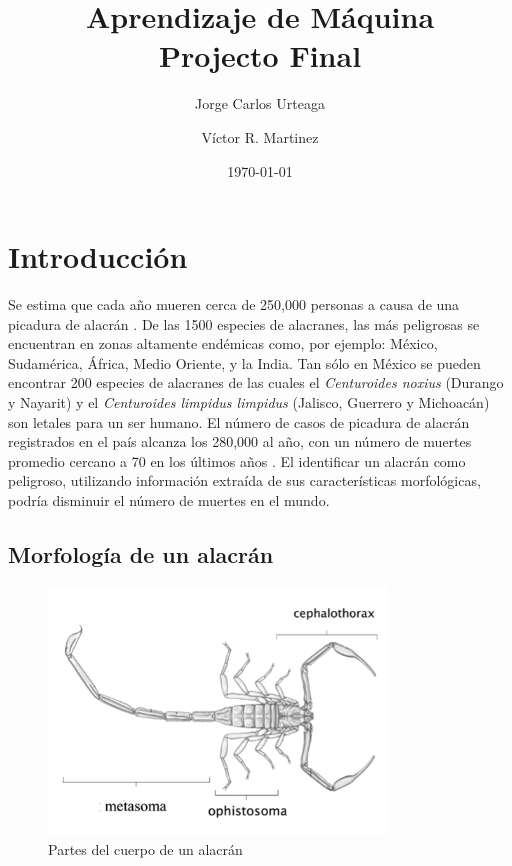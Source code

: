 \documentclass[a4paper, 10pt]{article}
\author{Jorge Carlos Urteaga \and Víctor R. Martinez}
\title{Aprendizaje de Máquina \\ Projecto Final}
\date{\today}
\begin{document}


\maketitle

\section{Introducción}
Se estima que cada año mueren cerca de 250,000 personas a causa de una picadura de alacrán \cite{Chippaux}. De las 1500 especies de alacranes, las más peligrosas se encuentran en zonas altamente endémicas como, por ejemplo: México, Sudamérica, África, Medio Oriente, y la India. Tan sólo en México se pueden encontrar 200 especies de alacranes de las cuales el \emph{Centuroides noxius} (Durango y Nayarit) y el \emph{Centuroides limpidus limpidus} (Jalisco, Guerrero y Michoacán) son letales para un ser humano. El número de casos de picadura de alacrán registrados en el país alcanza los 280,000 al año, con un número de muertes promedio cercano a 70 en los últimos años \cite{epidemiologia}. El identificar un alacrán como peligroso, utilizando información extraída de sus características morfológicas, podría disminuir el número de muertes en el mundo. \\

\subsection{Morfología de un alacrán}

\begin{figure}[tb]
  \begin{center}
    \includegraphics[width=9cm]{s4.png}
  \end{center}
  \caption{Partes del cuerpo de un alacrán}
  \label{fig:cuerpo}
\end{figure}
\end{document}
